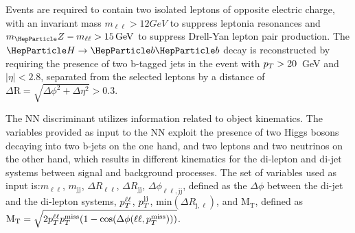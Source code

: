 Events are required to contain two isolated leptons of opposite electric charge, with an invariant mass $m_{\ell\ell} > 12
GeV$ to suppress leptonia resonances and $m_\PZ - m_{\ell\ell} > 15\GeV$ to suppress Drell-Yan lepton pair production.
The $\PH\to\PQb\PQb$ decay is reconstructed by requiring the presence of two b-tagged jets in the event with $p_{T} > 20$~GeV and $| \eta | < 2.8$, separated from the selected leptons by a distance of $\Delta \text{R} = \sqrt{\Delta \phi^2 + \Delta \eta^2} > 0.3$.




The NN discriminant utilizes information related
to object kinematics.
The variables provided as input to the NN exploit the presence of two Higgs  bosons decaying into two b-jets on the one hand, and two leptons and two neutrinos on the other hand, 
which results in different kinematics for the di-lepton and di-jet systems between signal and 
background processes.
The set of variables used as input is:$ m_{\ell\ell}$, $m_\text{jj}$,
$\Delta R_{\ell\ell}$, $\Delta R_{\text{j}\text{j}}$, $\Delta \phi_{\ell\ell, \text{j}\text{j}}$, defined as 
the $\Delta \phi$ between the di-jet and the di-lepton systems, $p_{T}^{\ell\ell}$, $p_{T}^{\text{j}\text{j}}$,
min$\left(\Delta R_{\text{j}, \ell}\right)$, and $\mathrm{M}_\mathrm{T}$, defined as
$\mathrm{M}_\mathrm{T} = \sqrt{2 p_{T}^{\ell\ell} p_{T}^\text{miss} (1 - \cos(\Delta \phi(\ell\ell, p_{T}^\text{miss})))}$.

